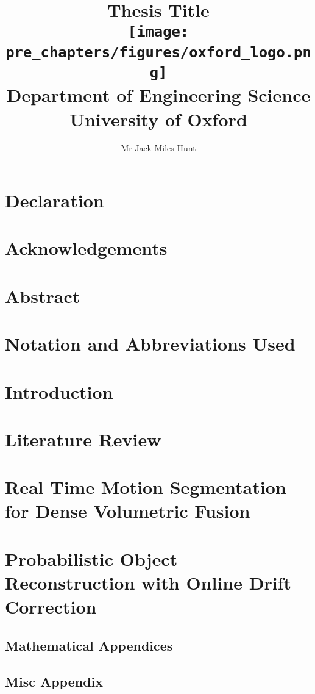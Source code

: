 \documentclass[12pt]{report}
\title{
    {Thesis Title}\\
    \vspace{10 mm}
    {\texttt{[image: pre\_chapters/figures/oxford\_logo.png]}\\
    {\large Department of Engineering Science\\ University of Oxford}\\}
}
\author{Mr Jack Miles Hunt}
\date{}
\begin{document}
\maketitle
\chapter*{Declaration}


\chapter*{Acknowledgements}


\chapter*{Abstract}


\chapter*{Notation and Abbreviations Used}


\tableofcontents
\chapter{Introduction}


\chapter{Literature Review}


\chapter{Real Time Motion Segmentation for Dense Volumetric Fusion}


\chapter{Probabilistic Object Reconstruction with Online Drift Correction}


\begin{appendices}
  \section{Mathematical Appendices}
  

  \section{Misc Appendix}
\end{appendices}


\end{document}
